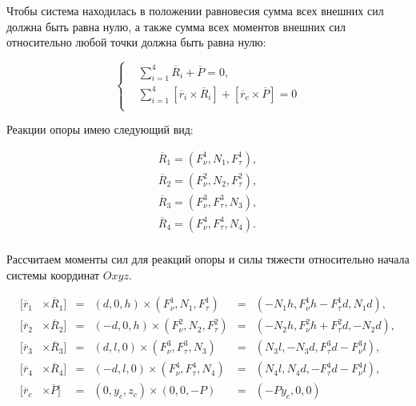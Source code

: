 Чтобы система находилась в положении равновесия сумма всех внешних сил должна быть равна нулю, а также сумма всех моментов внешних сил относительно любой точки должна быть равна нулю:

\begin{equation}
\label{eq:general_static_equations}
  \left\{
    \begin{alignedat}{3}
      &\sum_{i=1}^4\overline{R}_i+\overline{P} = 0, \\
      &\sum_{i=1}^4[\overline{r}_i\times\overline{R}_i] + [\overline{r}_c\times\overline{P}] = 0\\
    \end{alignedat}
  \right.
\end{equation}


Реакции опоры имею следующий вид:

\begin{equation}
\label{articulated:case_1_forces}
\begin{alignedat}{2}
  \overline{R}_1 = (F^1_\nu, N_1, F^1_\tau),\\
  \overline{R}_2 = (F^2_\nu, N_2, F^2_\tau),\\
  \overline{R}_3 = (F^3_\nu, F^3_\tau, N_3),\\
  \overline{R}_4 = (F^4_\nu, F^4_\tau, N_4).\\
\end{alignedat}
\end{equation}

Рассчитаем моменты сил для реакций опоры и силы тяжести относительно начала системы координат $Oxyz$.

\begin{equation}
\label{articulated:case_1_momentums}
  \begin{alignedat}{3}
    [\overline{r}_1&\times\overline{R}_1] &=&  (d,0,h)\times(F_\nu^1, N_1, F_\tau^1) &=& (-N_1h,F_\nu^1h - F_\tau^1d,N_1d),  \\
    [\overline{r}_2&\times\overline{R}_2] &=& (-d,0,h)\times(F_\nu^2, N_2, F_\tau^2) &=& (-N_2h,F_\nu^2h + F_\tau^2d,-N_2d), \\
    [\overline{r}_3&\times\overline{R}_3] &=&  (d,l,0)\times(F_\nu^3, F_\tau^3, N_3) &=& (N_3l,-N_3d, F_\tau^3d-F_\nu^3l), \\
    [\overline{r}_4&\times\overline{R}_4] &=& (-d,l,0)\times(F_\nu^4, F_\tau^4, N_4) &=& (N_4l, N_4d,-F_\tau^4d-F_\nu^4l),\\
    [\overline{r}_c&\times\overline{P}]   &=&  (0, y_c, z_c)\times(0,0,-P) &=& (-Py_c,0,0)\\
  \end{alignedat}
\end{equation}

